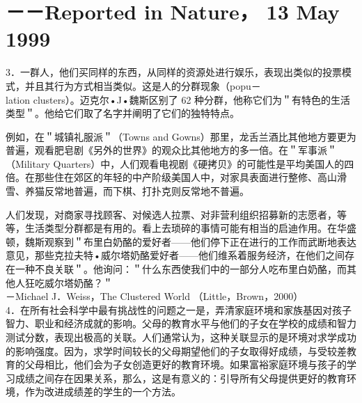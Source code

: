 \section*{－－Reported in Nature， 13 May 1999}
3．一群人，他们买同样的东西，从同样的资源处进行娱乐，表现出类似的投票模式，并且其行为方式相当类似。这是人的分群现象（popu－\\
lation clusters）。迈克尔•J•魏斯区别了 62 种分群，他称它们为＂有特色的生活类型＂。他给它们取了名字并阐明了它们的独特特点。

例如，在＂城镇礼服派＂（Towns and Gowns）那里，龙舌兰酒比其他地方要更为普遍，观看肥皂剧《另外的世界》的观众比其他地方的多一倍。在＂军事派＂（Military Quarters）中，人们观看电视剧《硬拷贝》的可能性是平均美国人的四倍。在那些住在郊区的年轻的中产阶级美国人中，对家具表面进行整修、高山滑雪、养猫反常地普遍，而下棋、打扑克则反常地不普遍。

人们发现，对商家寻找顾客、对候选人拉票、对非营利组织招募新的志愿者，等等，生活类型分群都是有用的。看上去琐碎的事情可能有相当的启迪作用。在华盛顿，魏斯观察到＂布里白奶酪的爱好者——他们停下正在进行的工作而武断地表达意见，那些克拉夫特•威尔塔奶酪爱好者——他们维系着服务经济，在他们之间存在一种不良关联＂。他询问：＂什么东西使我们中的一部分人吃布里白奶酪，而其他人狂吃威尔塔奶酪？＂\\
－Michael J．Weiss，The Clustered World （Little，Brown，2000）\\
4．在所有社会科学中最有挑战性的问题之一是，弄清家庭环境和家族基因对孩子智力、职业和经济成就的影响。父母的教育水平与他们的子女在学校的成绩和智力测试分数，表现出极高的关联。人们通常认为，这种关联显示的是环境对求学成功的影响强度。因为，求学时间较长的父母期望他们的子女取得好成绩，与受较差教育的父母相比，他们会为子女创造更好的教育环境。如果富裕家庭环境与孩子的学习成绩之间存在因果关系，那么，这是有意义的：引导所有父母提供更好的教育环境，作为改进成绩差的学生的一个方法。

